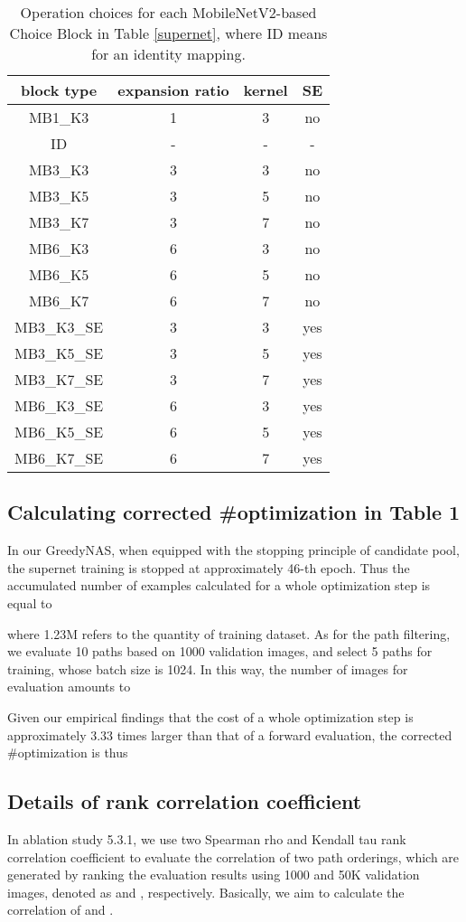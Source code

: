 \documentclass[10pt,twocolumn,letterpaper]{article}
\begin{document}
\begin{table}[h]
	\centering
	\small
	\caption{Operation choices for each MobileNetV2-based Choice Block in Table \ref{supernet}, where ID means for an identity mapping.}
	\label{buildingblock}
	\begin{tabular}{c|c|c|c} 
		\hline
		{block type} &{expansion ratio} & {kernel} & {SE} \\ \hline
		MB1\_K3 & 1 & 3 & no \\ \hline
		ID &- &-&- \\
		MB3\_K3 & 3 & 3 & no \\
		MB3\_K5 & 3 & 5 & no \\
		MB3\_K7 & 3 & 7 & no \\
		MB6\_K3 & 6 & 3 & no \\
		MB6\_K5 & 6 & 5 & no \\
		MB6\_K7 & 6 & 7 & no \\ \hline 
		MB3\_K3\_SE & 3 & 3 & yes \\
		MB3\_K5\_SE & 3 & 5 & yes \\
		MB3\_K7\_SE & 3 & 7 & yes \\
		MB6\_K3\_SE & 6 & 3 & yes \\
		MB6\_K5\_SE & 6 & 5 & yes \\
		MB6\_K7\_SE & 6 & 7 & yes \\
		\hline
	\end{tabular}
\end{table}


\subsection{Calculating corrected \#optimization in Table 1}
In our GreedyNAS, when equipped with the stopping principle of candidate pool, the supernet training is stopped at approximately 46-th epoch. Thus the accumulated number of examples calculated for a whole optimization step is equal to 

where 1.23M refers to the quantity of training dataset. As for the path filtering, we evaluate 10 paths based on 1000 validation images, and select 5 paths for training, whose batch size is 1024. In this way, the number of images for evaluation amounts to 

Given our empirical findings that the cost of a whole optimization step is approximately 3.33 times larger than that of a forward evaluation, the corrected \#optimization is thus 


\subsection{Details of rank correlation coefficient}
In ablation study 5.3.1, we use two Spearman rho \cite{pirie2004s} and Kendall tau \cite{tau} rank correlation coefficient to evaluate the correlation of two path orderings, which are generated by ranking the evaluation results using 1000 and 50K validation images, denoted as  and ,  respectively. Basically, we aim to calculate the correlation of  and . 
\end{document}
